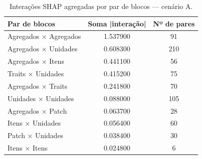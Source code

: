 \begin{table}[htbp]
\caption{Interações SHAP agregadas por par de blocos — cenário A.}
\label{tab:interbA}
\centering
\small
\begin{tabular}{lcc}
\toprule
Par de blocos & Soma |interação| & Nº de pares \\
\midrule
Agregados × Agregados & 1.537900 & 91 \\
Agregados × Unidades & 0.608300 & 210 \\
Agregados × Itens & 0.441100 & 56 \\
Traits × Unidades & 0.415200 & 75 \\
Agregados × Traits & 0.241800 & 70 \\
Unidades × Unidades & 0.088000 & 105 \\
Agregados × Patch & 0.063700 & 28 \\
Itens × Unidades & 0.056400 & 60 \\
Patch × Unidades & 0.038400 & 30 \\
Itens × Itens & 0.024800 & 6 \\
\bottomrule
\end{tabular}
\end{table}
